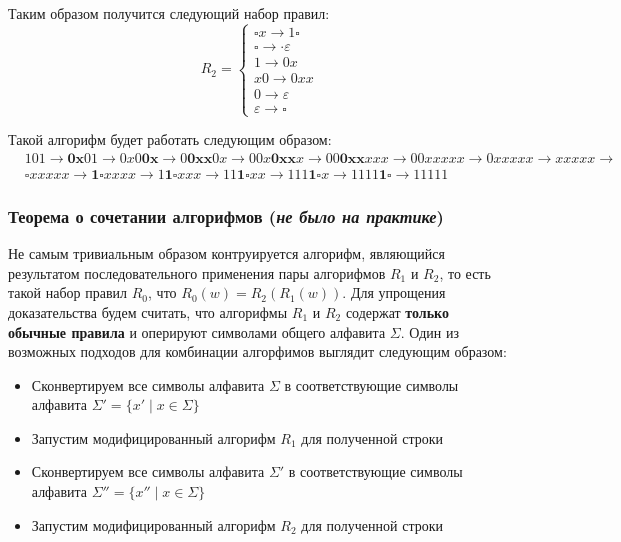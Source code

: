 \documentclass[
    11pt,
    a4paper
]{article}
\theoremstyle{definition}
\begin{document}
Таким образом получится следующий набор правил:
$$R_2 = \begin{cases}\square x \rightarrow 1 \square\\\square \rightarrow \cdot \varepsilon\\1 \rightarrow 0x\\x0 \rightarrow 0xx\\ 0 \rightarrow \varepsilon\\\varepsilon \rightarrow \square\end{cases}$$

Такой алгорифм будет работать следующим образом:
\begin{align*}
&101 \rightarrow \mathbf{0x}01 \rightarrow 0x0\mathbf{0x} \rightarrow 0\mathbf{0xx}0x \rightarrow 00x\mathbf{0xx}x \rightarrow 00\mathbf{0xx}xxx \rightarrow 00xxxxx \rightarrow 0xxxxx \rightarrow xxxxx \rightarrow\\
&\mathbf{\square} xxxxx \rightarrow \mathbf{1\square} xxxx \rightarrow 1\mathbf{1\square} xxx \rightarrow 11\mathbf{1\square} xx \rightarrow 111\mathbf{1\square} x \rightarrow 1111\mathbf{1\square} \rightarrow 11111
\end{align*}

\subsubsection{Теорема о сочетании алгорифмов (\textit{не было на практике})}
Не самым тривиальным образом контруируется алгорифм, являющийся результатом последовательного применения пары алгорифмов $R_1$ и $R_2$, то есть такой набор правил $R_0$, что $R_0(w) = R_2(R_1(w))$. Для упрощения доказательства будем считать, что алгорифмы $R_1$ и $R_2$ содержат \textbf{только обычные правила} и оперируют символами общего алфавита $\Sigma$. Один из возможных подходов для комбинации алгорфимов выглядит следующим образом:
\begin{itemize}
\item Сконвертируем все символы алфавита $\Sigma$ в соответствующие символы алфавита $\Sigma' = \{x' \mid x \in \Sigma\}$
\item Запустим модифицированный алгорифм $R_1$ для полученной строки
\item Сконвертируем все символы алфавита $\Sigma'$ в соответствующие символы алфавита  $\Sigma'' = \{x'' \mid x \in \Sigma\}$
\item Запустим модифицированный алгорифм $R_2$ для полученной строки
\end{itemize}
\end{document}
